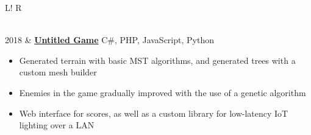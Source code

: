 \documentclass[10pt, a4paper]{article}
\newcommand\vsep{\color{lightgray} \vrule width 0.5pt}
\newcommand\itemizespace{\vspace{-0.65\baselineskip}}
\newcommand\tspace{\hfill}
\begin{document}
\begin{tabular}{L!{\vsep}R}
\begin{itemize}[label=\raisebox{0.25ex}{\tiny$\bullet$}]
                        \itemizespace
                    \end{itemize} \\
                2018 & \href{https://github.com/lin-e/CSProject2017}{\textbf{Untitled Game}} \tspace C\#, PHP, JavaScript, Python
                    \begin{itemize}[label=\raisebox{0.25ex}{\tiny$\bullet$}]
                        \setlength{\itemindent}{-0.125in}
                        \item Generated terrain with basic MST algorithms, and generated trees with a custom mesh builder
                        \item Enemies in the game gradually improved with the use of a genetic algorithm
                        \item Web interface for scores, as well as a custom library for low-latency IoT lighting over a LAN

\end{itemize}
\end{tabular}
\end{document}

